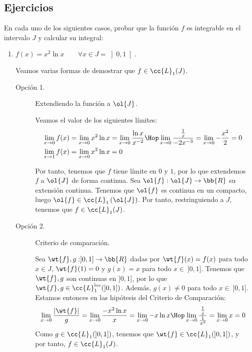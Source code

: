 \newpage
\subsection{Ejercicios}
\begin{ejercicio}
    En cada uno de los siguientes casos, probar que la función $f$ es integrable en el intervalo $J$ y calcular su integral:
    \begin{enumerate}
        \item $f(x)=x^2\ln x \qquad \forall x\in J=\left]0,1\right[$.
        
        Veamos varias formas de demostrar que $f\in \cc{L}_1(J)$.
        \begin{description}
            \item[Opción 1.] Extendiendo la función a $\ol{J}$.
            
            Veamos el valor de los siguientes límites:
            \begin{align*}
                \lim_{x\to 0} f(x) &= \lim_{x\to 0} x^2\ln x = \lim_{x\to 0} \dfrac{\ln x}{x^{-2}} \Hop \lim_{x\to 0} \dfrac{\frac{1}{x}}{-2x^{-3}} = \lim_{x\to 0} -\dfrac{x^2}{2} = 0\\
                \lim_{x\to 1} f(x) &= \lim_{x\to 0} x^2\ln x = 0
            \end{align*}

            Por tanto, tenemos que $f$ tiene límite en $0$ y $1$, por lo que extendemos $f$ a $\ol{J}$ de forma continua.
            Sea $\ol{f}:\ol{J}\to \bb{R}$ su extensión continua. Tenemos que $\ol{f}$ es continua en un compacto,
            luego $\ol{f}\in \cc{L}_1\left(\ol{J}\right)$. Por tanto, restringuiendo a $J$, tenemos que $f\in \cc{L}_1(J)$.

            \item[Opción 2.] Criterio de comparación.
            
            Sea $\wt{f},g:]0,1] \to \bb{R}$ dadas por $\wt{f}(x)=f(x)$ para todo $x\in J$, $\wt{f}(1)=0$ y $g(x)=x$ para todo $x\in~]0,1]$. Tenemos que
            $\wt{f},g$ son continuas en $]0,1]$, por lo que $\wt{f},g\in \cc{L}^{\text{loc}}_1(]0,1])$. Además, $g(x)\neq 0$ para todo $x\in~]0,1]$. Estamos entonces en las hipótesis del Criterio de Comparación:
            \begin{equation*}
                \lim_{x\to 0} \dfrac{|\wt{f}|}{g}
                = \lim_{x\to 0} \dfrac{-x^2\ln x}{x}
                = \lim_{x\to 0} -x\ln x
                \Hop \lim_{x\to 0} \dfrac{\frac{1}{x}}{\frac{1}{x^2}}
                = \lim_{x\to 0} x = 0
            \end{equation*}
            Como $g\in \cc{L}_1(]0,1])$, tenemos que $\wt{f}\in \cc{L}_1(]0,1])$, y por tanto, $f\in \cc{L}_1(J)$.
        \end{description}
        

\end{enumerate}
\end{ejercicio}
